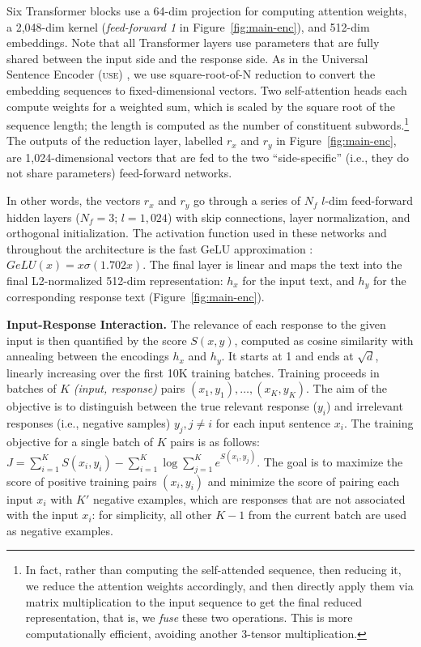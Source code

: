 \documentclass[11pt,a4paper]{article}
\begin{document}
Six Transformer blocks use a 64-dim projection for computing attention weights, a 2,048-dim kernel (\textit{feed-forward 1} in Figure~\ref{fig:main-enc}), and 512-dim embeddings. Note that all Transformer layers use parameters that are fully shared between the input side and the response side. As in the Universal Sentence Encoder (\textsc{use}) \cite{Cer:2018arxiv}, we use square-root-of-N reduction to convert the embedding sequences to fixed-dimensional vectors. Two self-attention heads each compute weights for a weighted sum, which is scaled by the square root of the sequence length; the length is computed as the number of constituent subwords.\footnote{In fact, rather than computing the self-attended sequence, then reducing it, we reduce the attention weights accordingly, and then directly apply them via matrix multiplication to the input sequence to get the final reduced representation, that is, we \emph{fuse} these two operations. This is more computationally efficient, avoiding another 3-tensor multiplication.} The outputs of the reduction layer, labelled $r_x$ and $r_y$ in Figure~\ref{fig:main-enc}, are 1,024-dimensional vectors that are fed to the two ``side-specific'' (i.e., they do not share parameters) feed-forward networks.

In other words, the vectors $r_x$ and $r_y$ go through a series of $N_{f}$ $l$-dim feed-forward hidden layers ($N_{f}=3$; $l=1,024$) with skip connections, layer normalization, and orthogonal initialization. The activation function used in these networks and throughout the architecture is the fast GeLU approximation \cite{hendrycks2016gelu}: $GeLU(x) = x \sigma(1.702 x)$. The final layer is linear and maps the text into the final L2-normalized 512-dim representation: $h_x$ for the input text, and $h_y$ for the corresponding response text (Figure~\ref{fig:main-enc}).

\vspace{1.4mm}
\noindent \textbf{Input-Response Interaction.}
The relevance of each response to the given input is then quantified by the score $S(x,y)$, computed as cosine similarity with annealing between the encodings $h_x$ and $h_y$. It starts at 1 and ends at $\sqrt{d}$, linearly increasing over the first 10K training batches. Training proceeds in batches of $K$ \textit{(input, response)} pairs $(x_1,y_1), \ldots, (x_K,y_K)$. The aim of the objective is to distinguish between the true relevant response ($y_i$) and irrelevant responses (i.e., negative samples) $y_j, j\neq i$ for each input sentence $x_i$. The training objective for a single batch of $K$ pairs is as follows: $J = \sum_{i=1}^K S(x_i,y_i) - \sum_{i=1}^K \log \sum_{j=1}^{K} e^{S(x_i,y_j)}$. The goal is to maximize the score of positive training pairs $(x_i, y_i)$ and minimize the score of pairing each input $x_i$ with $K'$ negative examples, which are responses that are not associated with the input $x_i$: for simplicity, all other $K-1$ from the current batch are used as negative examples.
\end{document}
